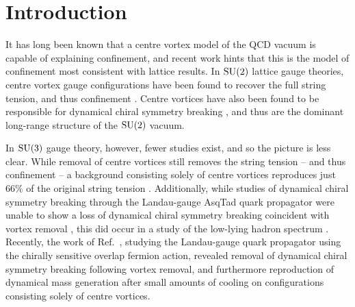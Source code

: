 \documentclass[
 reprint,
 amsmath,amssymb,
 aps,
prd,
]{revtex4-1}
\begin{document}

\maketitle




\section{Introduction}

It has long been known that a centre vortex \cite{'tHooft:1977hy,'tHooft:1979uj,Cornwall:1979hz,Nielsen:1979xu,Ambjorn:1980ms,Vinciarelli:1978kp,Yoneya:1978dt,Mack:1978rq} model of the QCD vacuum is capable of explaining confinement, and recent work \cite{Greensite:2014gra} hints that this is the model of confinement most consistent with lattice results. In $\mathrm{SU}(2)$ lattice gauge theories, centre vortex gauge configurations have been found to recover the full string tension, and thus confinement \cite{DelDebbio:1998uu,DelDebbio:1996mh}. Centre vortices have also been found to be responsible for dynamical chiral symmetry breaking \cite{Bowman:2008qd,deForcrand:1999ms,Alexandrou:1999vx,Engelhardt:2002qs,Bornyakov:2007fz,Hollwieser:2008tq,Hollwieser:2013xja,Hollwieser:2014osa,Hoellwieser:2014isa,Alexandrou:1999vx,Kovalenko:2005rz}, and thus are the dominant long-range structure of the $\mathrm{SU}(2)$ vacuum. \par 
In $\mathrm{SU}(3)$ gauge theory, however, fewer studies exist, and so the picture is less clear. While removal of centre vortices still removes the string tension -- and thus confinement -- a background consisting solely of centre vortices reproduces just $66\%$ of the original string tension \cite{Langfeld:2003ev,Cais:2008za}. Additionally, while studies of dynamical chiral symmetry breaking through the Landau-gauge AsqTad quark propagator were unable to show a loss of dynamical chiral symmetry breaking coincident with vortex removal \cite{Bowman:2010zr}, this did occur in a study of the low-lying hadron spectrum \cite{OMalley:2011aa}. Recently, the work of Ref.~\cite{Trewartha:2015nna}, studying the Landau-gauge quark propagator using the chirally sensitive overlap fermion action, revealed removal of dynamical chiral symmetry breaking following vortex removal, and furthermore reproduction of dynamical mass generation after small amounts of cooling on configurations consisting solely of centre vortices. \par
\end{document}
